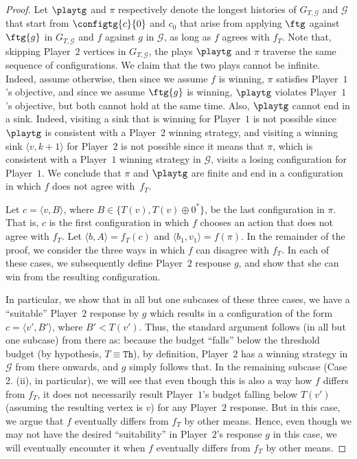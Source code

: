 \documentclass{theoretics}
\newcommand{\PO}{Player~$1$\xspace}
\newcommand{\PT}{Player~$2$\xspace}
\newcommand{\G}{{\mathcal G}}
\newcommand{\thresh}{\texttt{Th}\xspace}
\newcommand{\zug}[1]{\langle #1  \rangle}
\newcommand{\succb}[1]{#1 \oplus 0^*\xspace}
\begin{document}
\begin{proof}
Let $\playtg$ and $\pi$ respectively denote the longest histories of $G_{T, \G}$ and $\G$ that start from $\configtg{c}{0}$ and \(c_0\) that arise from applying $\ftg$ against \(\ftg{g}\) in \(G_{T, \G}\) and \(f\) against \(g\) in \(\G\), as long as $f$ agrees with $f_T$. Note that, skipping \PT vertices in $G_{T,\G}$, the plays $\playtg$ and $\pi$ traverse the same sequence of configurations. We claim that the two plays cannot be infinite. Indeed, assume otherwise, then since we assume $f$ is winning, $\pi$ satisfies \PO's objective, and since we assume $\ftg{g}$ is winning, $\playtg$ violates \PO's objective, but both cannot hold at the same time. 
Also, $\playtg$ cannot end in a sink. Indeed, visiting a sink that is winning for \PO is not possible since $\playtg$ is consistent with a \PT winning strategy, and visiting a winning sink $\zug{v, k+1}$ for \PT is not possible since it means that $\pi$, which is consistent with a \PO winning strategy in $\G$, visits a losing configuration for \PO.   We conclude that $\pi$ and $\playtg$ are finite and end in a configuration in which \(f\) does not agree with~\(f_T\). 

Let $c = \zug{v, B}$, where \(B \in \{T(v), \succb{T(v)}\}\), be the last configuration in $\pi$. 
That is, $c$ is the first configuration in which $f$ chooses an action that does not agree with $f_T$. Let $\zug{b,A} = f_T(c)$ and $\zug{b_1, v_1} = f(\pi)$. 
In the remainder of the proof, we consider the three ways in which $f$ can disagree with $f_T$. 
In each of these cases, we subsequently define \PT response \(g\), and show that she can win from the resulting configuration. 

In particular, we show that in all but one subcases of these three cases, we have a ``suitable'' \PT response by \(g\) which results in a configuration of the form \(c = \zug{v', B'}\), where \(B' < T(v')\). 
Thus, the standard argument follows (in all but one subcase) from there as: because the budget ``falls'' below the threshold budget (by hypothesis, \(T \equiv \thresh\)), by definition, \PT has a winning strategy in \(\G\) from there onwards, and \(g\) simply follows that. 
In the remaining subcase (Case 2. (ii), in particular), we will see that even though this is also a way how \(f\) differs from \(f_T\), it does not necessarily result \PO's budget falling below \(T(v')\) (assuming the resulting vertex is \(v\)) for any \PT response. 
But in this case, we argue that \(f\) eventually differs from \(f_T\) by other means. 
Hence, even though we may not have the desired ``suitability'' in  \PT's response \(g\) in this case, we will eventually encounter it when \(f\) eventually differs from \(f_T\) by other means. 



\end{proof}
\end{document}
